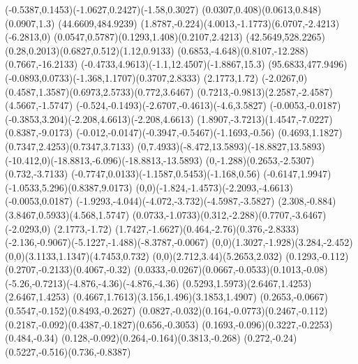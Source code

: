 {    \rcurveto(-0.5387,0.1453)(-1.0627,0.2427)(-1.58,0.3027)
    \rcurveto(0.0307,0.408)(0.0613,0.848)(0.0907,1.3)
    \moveto(44.6609,484.9239)
    \rcurveto(1.8787,-0.224)(4.0013,-1.1773)(6.0707,-2.4213)
    \rlineto(-6.2813,0)
    \rcurveto(0.0547,0.5787)(0.1293,1.408)(0.2107,2.4213)
    \moveto(42.5649,528.2265)
    \rcurveto(0.28,0.2013)(0.6827,0.512)(1.12,0.9133)
    \rcurveto(0.6853,-4.648)(0.8107,-12.288)(0.7667,-16.2133)
    \rcurveto(-0.4733,4.9613)(-1.1,12.4507)(-1.8867,15.3)
    \closepath
    \moveto(95.6833,477.9496)
    \rcurveto(-0.0893,0.0733)(-1.368,1.1707)(0.3707,2.8333)
    \rlineto(2.1773,1.72)
    \rlineto(-2.0267,0)
    \rcurveto(0.4587,1.3587)(0.6973,2.5733)(0.772,3.6467)
    \rcurveto(0.7213,-0.9813)(2.2587,-2.4587)(4.5667,-1.5747)
    \rcurveto(-0.524,-0.1493)(-2.6707,-0.4613)(-4.6,3.5827)
    \rlineto(-0.0053,-0.0187)
    \rcurveto(-0.3853,3.204)(-2.208,4.6613)(-2.208,4.6613)
    \rcurveto(1.8907,-3.7213)(1.4547,-7.0227)(0.8387,-9.0173)
    \rcurveto(-0.012,-0.0147)(-0.3947,-0.5467)(-1.1693,-0.56)
    \rcurveto(0.4693,1.1827)(0.7347,2.4253)(0.7347,3.7133)
    \rcurveto(0,7.4933)(-8.472,13.5893)(-18.8827,13.5893)
    \rcurveto(-10.412,0)(-18.8813,-6.096)(-18.8813,-13.5893)
    \rcurveto(0,-1.288)(0.2653,-2.5307)(0.732,-3.7133)
    \rcurveto(-0.7747,0.0133)(-1.1587,0.5453)(-1.168,0.56)
    \rcurveto(-0.6147,1.9947)(-1.0533,5.296)(0.8387,9.0173)
    \rcurveto(0,0)(-1.824,-1.4573)(-2.2093,-4.6613)
    \rlineto(-0.0053,0.0187)
    \rcurveto(-1.9293,-4.044)(-4.072,-3.732)(-4.5987,-3.5827)
    \rcurveto(2.308,-0.884)(3.8467,0.5933)(4.568,1.5747)
    \rcurveto(0.0733,-1.0733)(0.312,-2.288)(0.7707,-3.6467)
    \rlineto(-2.0293,0)
    \rlineto(2.1773,-1.72)
    \rcurveto(1.7427,-1.6627)(0.464,-2.76)(0.376,-2.8333)
    \rcurveto(-2.136,-0.9067)(-5.1227,-1.488)(-8.3787,-0.0067)
    \rcurveto(0,0)(1.3027,-1.928)(3.284,-2.452)
    \rcurveto(0,0)(3.1133,1.1347)(4.7453,0.732)
    \rcurveto(0,0)(2.712,3.44)(5.2653,2.032)
    \rcurveto(0.1293,-0.112)(0.2707,-0.2133)(0.4067,-0.32)
    \rcurveto(0.0333,-0.0267)(0.0667,-0.0533)(0.1013,-0.08)
    \rcurveto(-5.26,-0.7213)(-4.876,-4.36)(-4.876,-4.36)
    \rcurveto(0.5293,1.5973)(2.6467,1.4253)(2.6467,1.4253)
    \rcurveto(0.4667,1.7613)(3.156,1.496)(3.1853,1.4907)
    \rcurveto(0.2653,-0.0667)(0.5547,-0.152)(0.8493,-0.2627)
    \rcurveto(0.0827,-0.032)(0.164,-0.0773)(0.2467,-0.112)
    \rcurveto(0.2187,-0.092)(0.4387,-0.1827)(0.656,-0.3053)
    \rcurveto(0.1693,-0.096)(0.3227,-0.2253)(0.484,-0.34)
    \rcurveto(0.128,-0.092)(0.264,-0.164)(0.3813,-0.268)
    \rcurveto(0.272,-0.24)(0.5227,-0.516)(0.736,-0.8387)
}
